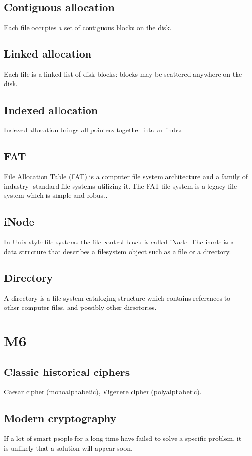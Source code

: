 \begin{multicols}{2}
\subsection{Contiguous allocation}
Each file occupies a set of contiguous blocks on the disk.

\subsection{Linked allocation}
Each file is a linked list of disk blocks: blocks may be
scattered anywhere on the disk.

\subsection{Indexed allocation}
Indexed allocation brings all pointers together into an index

\subsection{FAT}
File Allocation Table (FAT) is a computer file
system architecture and a family of industry-
standard file systems utilizing it. The FAT file
system is a legacy file system which is simple and robust.

\subsection{iNode}
In Unix-style file systems the file control
block is called iNode.
The inode is a data structure that
describes a filesystem object such as
a file or a directory.

\subsection{Directory}
 A directory is a file system cataloging
structure which contains references to
other computer files, and possibly other
directories.

\section{M6}
\subsection{Classic historical ciphers}
Caesar cipher (monoalphabetic),
Vigenere cipher (polyalphabetic).

\subsection{Modern cryptography}
If a lot of smart people for a long time have failed to solve a specific problem,
it is unlikely that a solution will appear soon. \newline


\end{multicols}
